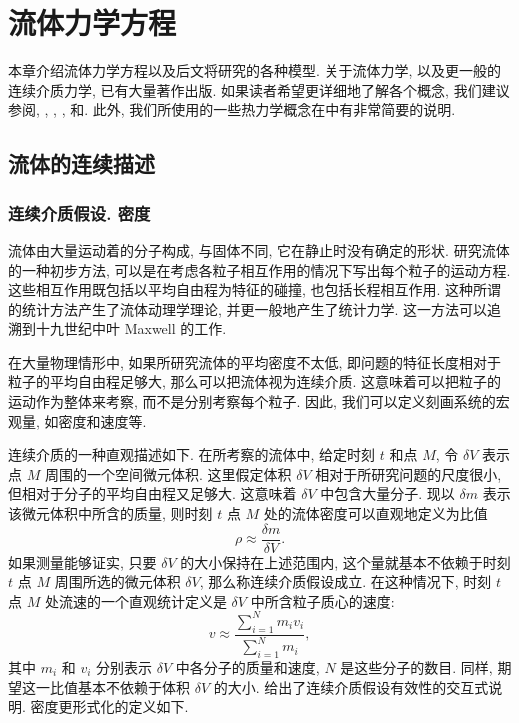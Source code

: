 \section{流体力学方程}
\label{chap:fluid-mechanics-equations}

本章介绍流体力学方程以及后文将研究的各种模型. 关于流体力学, 以及更一般的连续介质力学, 已有大量著作出版. 如果读者希望更详细地了解各个概念, 我们建议参阅, , , , 和. 此外, 我们所使用的一些热力学概念在中有非常简要的说明.

\subsection{流体的连续描述}
\label{sec:chap1-continuous-description}

\subsubsection{连续介质假设. 密度}
\label{subsec:chap1-continuum-density}

流体由大量运动着的分子构成, 与固体不同, 它在静止时没有确定的形状. 研究流体的一种初步方法, 可以是在考虑各粒子相互作用的情况下写出每个粒子的运动方程. 这些相互作用既包括以平均自由程为特征的碰撞, 也包括长程相互作用. 这种所谓的统计方法产生了流体动理学理论, 并更一般地产生了统计力学. 这一方法可以追溯到十九世纪中叶 Maxwell 的工作.

在大量物理情形中, 如果所研究流体的平均密度不太低, 即问题的特征长度相对于粒子的平均自由程足够大, 那么可以把流体视为连续介质. 这意味着可以把粒子的运动作为整体来考察, 而不是分别考察每个粒子. 因此, 我们可以定义刻画系统的宏观量, 如密度和速度等.

连续介质的一种直观描述如下. 在所考察的流体中, 给定时刻 $t$ 和点 $M$, 令 $\delta V$ 表示点 $M$ 周围的一个空间微元体积. 这里假定体积 $\delta V$ 相对于所研究问题的尺度很小, 但相对于分子的平均自由程又足够大. 这意味着 $\delta V$ 中包含大量分子. 现以 $\delta m$ 表示该微元体积中所含的质量, 则时刻 $t$ 点 $M$ 处的流体密度可以直观地定义为比值
\[
  \rho\approx\frac{\delta m}{\delta V}.
\]
如果测量能够证实, 只要 $\delta V$ 的大小保持在上述范围内, 这个量就基本不依赖于时刻 $t$ 点 $M$ 周围所选的微元体积 $\delta V$, 那么称连续介质假设成立. 在这种情况下, 时刻 $t$ 点 $M$ 处流速的一个直观统计定义是 $\delta V$ 中所含粒子质心的速度:
\[
  v\approx\frac{\sum_{i=1}^{N}m_i v_i}{\sum_{i=1}^{N}m_i},
\]
其中 $m_i$ 和 $v_i$ 分别表示 $\delta V$ 中各分子的质量和速度, $N$ 是这些分子的数目. 同样, 期望这一比值基本不依赖于体积 $\delta V$ 的大小. 给出了连续介质假设有效性的交互式说明. 密度更形式化的定义如下.

